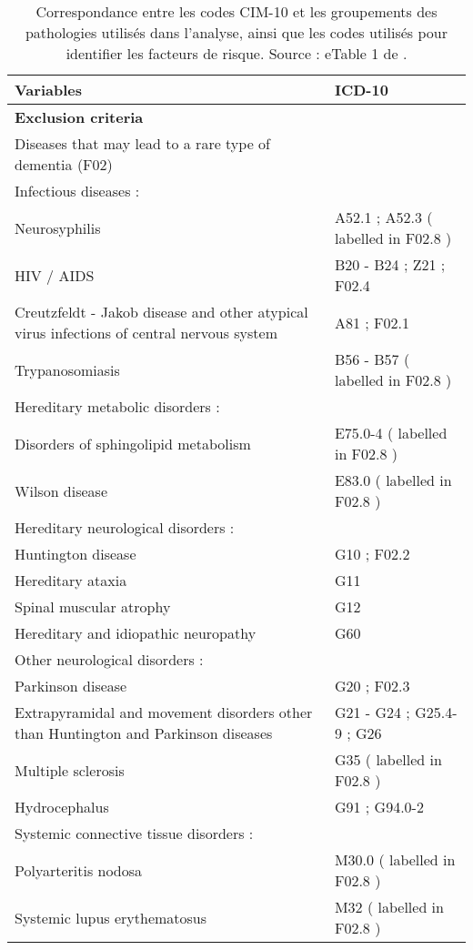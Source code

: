 
\begin{longtable}[t]{>{\raggedright\arraybackslash}p{17em}>{\raggedright\arraybackslash}p{17em}}
\caption{\label{tab:ph-icd10-codes}Correspondance entre les codes CIM-10 et les groupements des
        pathologies utilisés dans l'analyse, ainsi que les codes utilisés pour
        identifier les facteurs de risque.
        Source : eTable 1 de \cite{schwarzinger_contribution_2018}.}\\
\toprule
Variables & ICD-10\\
\midrule
\textbf{Exclusion criteria} & \textbf{}\\
Diseases that may lead to a rare type of dementia (F02) & \\
Infectious diseases : & \\
Neurosyphilis & A52.1 ; A52.3 ( labelled in F02.8 )\\
HIV / AIDS & B20 - B24 ; Z21 ; F02.4\\
\addlinespace
Creutzfeldt - Jakob disease and other atypical virus
         infections of central nervous system & A81 ; F02.1\\
Trypanosomiasis & B56 - B57 ( labelled in F02.8 )\\
Hereditary metabolic disorders : & \\
Disorders of sphingolipid metabolism & E75.0-4 ( labelled in F02.8 )\\
Wilson disease & E83.0 ( labelled in F02.8 )\\
\addlinespace
Hereditary neurological disorders : & \\
Huntington disease & G10 ; F02.2\\
Hereditary ataxia & G11\\
Spinal muscular atrophy & G12\\
Hereditary and idiopathic neuropathy & G60\\
\addlinespace
Other neurological disorders : & \\
Parkinson disease & G20 ; F02.3\\
Extrapyramidal and movement disorders other than
         Huntington and Parkinson diseases & G21 - G24 ; G25.4-9 ; G26\\
Multiple sclerosis & G35 ( labelled in F02.8 )\\
Hydrocephalus & G91 ; G94.0-2\\
\addlinespace
Systemic connective tissue disorders : & \\
Polyarteritis nodosa & M30.0 ( labelled in F02.8 )\\
Systemic lupus erythematosus & M32 ( labelled in F02.8 )\\

\end{longtable}
